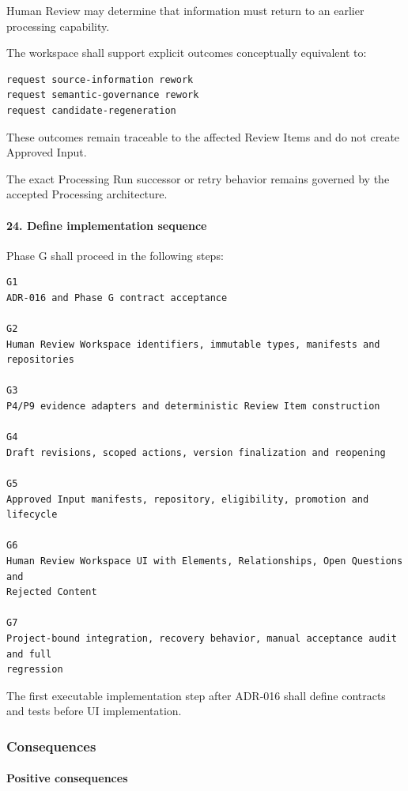 Human Review may determine that information must return to an earlier processing capability.

The workspace shall support explicit outcomes conceptually equivalent to:

\begin{verbatim}
request source-information rework
request semantic-governance rework
request candidate-regeneration
\end{verbatim}

These outcomes remain traceable to the affected Review Items and do not create Approved Input.

The exact Processing Run successor or retry behavior remains governed by the accepted Processing architecture.

\hypertarget{24-define-implementation-sequence}{%
\paragraph{24. Define implementation sequence}\label{24-define-implementation-sequence}}

Phase G shall proceed in the following steps:

\begin{verbatim}
G1
ADR-016 and Phase G contract acceptance

G2
Human Review Workspace identifiers, immutable types, manifests and repositories

G3
P4/P9 evidence adapters and deterministic Review Item construction

G4
Draft revisions, scoped actions, version finalization and reopening

G5
Approved Input manifests, repository, eligibility, promotion and lifecycle

G6
Human Review Workspace UI with Elements, Relationships, Open Questions and
Rejected Content

G7
Project-bound integration, recovery behavior, manual acceptance audit and full
regression
\end{verbatim}

The first executable implementation step after ADR-016 shall define contracts and tests before UI implementation.

\hypertarget{consequences-1}{%
\subsubsection{Consequences}\label{consequences-1}}

\hypertarget{positive-consequences-2}{%
\paragraph{Positive consequences}\label{positive-consequences-2}}

